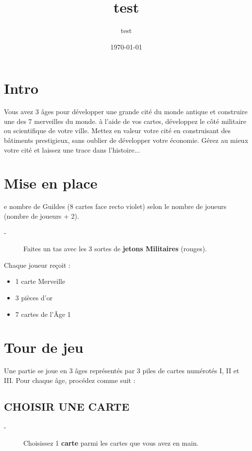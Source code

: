\documentclass{article}%
\title{test}%
\author{test}%
\date{\today}%
\begin{document}
%
\pagestyle{empty}%
\normalsize%
\maketitle%
\section{ Intro
}%
\label{sec:Intro}%
Vous avez 3 âges pour développer une grande cité du monde antique et construire une des 7 merveilles du
%
monde. à l’aide de vos cartes, développez le côté militaire ou scientifique de votre ville. Mettez en valeur
%
votre cité en construisant des bâtiments prestigieux, sans oublier de développer votre économie.
%
Gérez au mieux votre cité et laissez une trace dans l'histoire...


%
\section{ Mise en place
}%
\label{sec:Miseenplace}%
e nombre de Guildes (8 cartes face recto violet) selon le nombre de joueurs (nombre de joueurs + 2).
%
\begin{description}%
\item[{-} ]%
%
 Faites un tas avec les 3 sortes de %
\textbf{jetons Militaires}%
\textit{ }%
 (rouges).
%
\end{description}%
Chaque joueur reçoit :
%
\begin{itemize}%
\item%
%
 1 carte Merveille
%
\item%
%
 3 pièces d’or
%
\item%
%
 7 cartes de l'Âge 1
%
\end{itemize}

%
\section{ Tour de jeu
}%
\label{sec:Tourdejeu}%
Une partie se joue en 3 âges représentés par 3 piles de cartes numérotés I, II et III. Pour chaque âge, procédez comme suit :


%
\subsection{ CHOISIR UNE CARTE
}%
\label{subsec:CHOISIRUNECARTE}%
\begin{description}%
\item[{-} ]%
%
 Choisissez 1 %
\textbf{carte}%
\textit{ }%
 parmi les cartes que vous avez en main.
%
\end{description}
\end{document}
